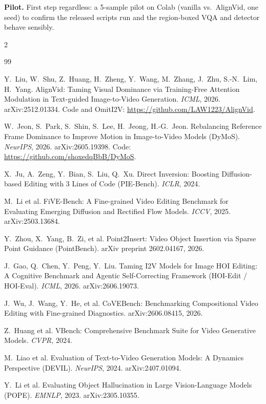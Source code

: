 \documentclass[10pt,a4paper]{article}
\begin{document}
\textbf{Pilot.} First step regardless: a 5-sample pilot on Colab (vanilla vs.\ AlignVid, one seed) to confirm the released scripts run and the region-boxed VQA and detector behave sensibly.

\scriptsize
\begin{multicols}{2}
\begin{thebibliography}{99}
\setlength{\itemsep}{0pt}

 Y.~Liu, W.~Shu, Z.~Huang, H.~Zheng, Y.~Wang, M.~Zhang, J.~Zhu, S.-N.~Lim, H.~Yang. AlignVid: Taming Visual Dominance via Training-Free Attention Modulation in Text-guided Image-to-Video Generation. \emph{ICML}, 2026. arXiv:2512.01334. Code and OmitI2V: \url{https://github.com/LAW1223/AlignVid}.

 W.~Jeon, S.~Park, S.~Shin, S.~Lee, H.~Jeong, H.-G.~Jeon. Rebalancing Reference Frame Dominance to Improve Motion in Image-to-Video Models (DyMoS). \emph{NeurIPS}, 2026. arXiv:2605.19398. Code: \url{https://github.com/shoxedqBbB/DyMoS}.

 X.~Ju, A.~Zeng, Y.~Bian, S.~Liu, Q.~Xu. Direct Inversion: Boosting Diffusion-based Editing with 3 Lines of Code (PIE-Bench). \emph{ICLR}, 2024.

 M.~Li et al. FiVE-Bench: A Fine-grained Video Editing Benchmark for Evaluating Emerging Diffusion and Rectified Flow Models. \emph{ICCV}, 2025. arXiv:2503.13684.

 Y.~Zhou, X.~Yang, B.~Zi, et al. Point2Insert: Video Object Insertion via Sparse Point Guidance (PointBench). arXiv preprint 2602.04167, 2026.

 J.~Gao, Q.~Chen, Y.~Peng, Y.~Liu. Taming I2V Models for Image HOI Editing: A Cognitive Benchmark and Agentic Self-Correcting Framework (HOI-Edit / HOI-Eval). \emph{ICML}, 2026. arXiv:2606.19073.

 J.~Wu, J.~Wang, Y.~He, et al. CoVEBench: Benchmarking Compositional Video Editing with Fine-grained Diagnostics. arXiv:2606.08415, 2026.

 Z.~Huang et al. VBench: Comprehensive Benchmark Suite for Video Generative Models. \emph{CVPR}, 2024.

 M.~Liao et al. Evaluation of Text-to-Video Generation Models: A Dynamics Perspective (DEVIL). \emph{NeurIPS}, 2024. arXiv:2407.01094.

 Y.~Li et al. Evaluating Object Hallucination in Large Vision-Language Models (POPE). \emph{EMNLP}, 2023. arXiv:2305.10355.


\end{thebibliography}
\end{multicols}
\end{document}
